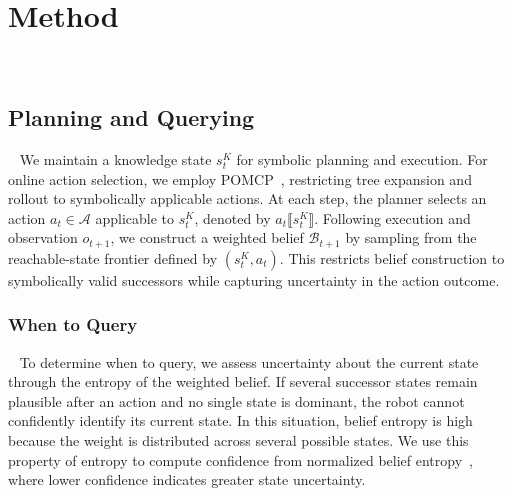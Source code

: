 
\section{Method}~\label{method:method}
\vspace{-25pt}
\subsection{Planning and Querying}~\label{method:overview}\label{method:planning}\label{method:PM}
We maintain a knowledge state $s_t^{K}$ for symbolic planning and execution. For online action selection, we employ POMCP~\citep{silver2010monte}, restricting tree expansion and rollout to symbolically applicable actions. At each step, the planner selects an action $a_t\in\mathcal{A}$ applicable to $s_t^{K}$, denoted by $a_t\llbracket s_t^{K}\rrbracket$. Following execution and observation $o_{t+1}$, we construct a weighted belief $\mathcal{B}_{t+1}$ by sampling from the reachable-state frontier defined by $(s_t^{K},a_t)$. This restricts belief construction to symbolically valid successors while capturing uncertainty in the action outcome.

\subsubsection{When to Query}~\label{method:when}\label{method:belief_rep}
To determine when to query, we assess uncertainty about the current state through the entropy of the weighted belief. If several successor states remain plausible after an action and no single state is dominant, the robot cannot confidently identify its current state. In this situation, belief entropy is high because the weight is distributed across several possible states. We use this property of entropy to compute confidence from normalized belief entropy~\citep{qu2023stochastic}, where lower confidence indicates greater state uncertainty.

